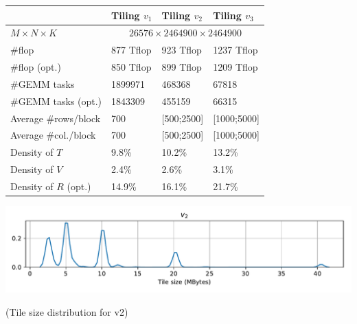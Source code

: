 \begin{frame}
\begin{columns}
    \begin{column}{.5\linewidth}
      \begin{center}
        \begin{tabular}{l|l|l|l}
          & Tiling $v_1$ & Tiling $v_2$ & Tiling $v_3$ \\\hline
          $M\times N\times K$ & \multicolumn{3}{|c}{$26576\times 2464900 \times 2464900$} \\\hline
          \#flop & 877 Tflop & 923 Tflop & 1237 Tflop \\\hline
          \#flop (opt.) & 850 Tflop & 899 Tflop & 1209 Tflop \\\hline
          \#GEMM tasks & 1899971 & 468368 & 67818 \\\hline
          \#GEMM tasks (opt.) & 1843309 &455159& 66315 \\\hline
          Average \#rows/block & 700 & [500;2500] & [1000;5000]\\\hline
          Average \#col./block & 700 & [500;2500] & [1000;5000]\\\hline
          Density of $T$ & 9.8\% &  10.2\% & 13.2\%\\\hline
          Density of $V$ & 2.4\% & 2.6\% & 3.1\%\\\hline
          Density of $R$ (opt.) & 14.9\% & 16.1\% & 21.7\%\\
        \end{tabular}

        \includegraphics[width=\linewidth]{bs-distrib.pdf}
        
        (Tile size distribution for v2)
      \end{center}
    \end{column}
  \end{columns}
  
\end{frame}

